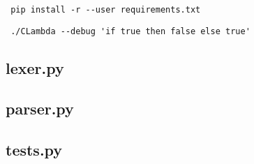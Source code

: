 \documentclass[spanish, a4paper]{article}
\begin{document}
\verb| pip install -r --user requirements.txt |

\verb| ./CLambda --debug 'if true then false else true' |

\subsection{lexer.py}
      
\newpage
\subsection{parser.py}
      

\subsection{tests.py}
      


%

\end{document}
